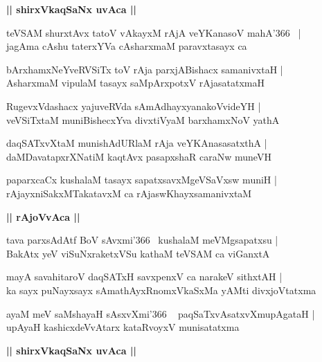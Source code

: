 \documentclass[twoside,12pt,openright]{book}
\newcounter{shloka}[chapter]
\def\uvaca#1{\centerline{{\large\textbf{#1}}}}
\begin{document}
\uvaca{|| shirxVkaqSaNx uvAca ||}

\begin{shloka}%
teVSAM shurxtAvx tatoV vAkayxM rAjA veYKanasoV mahA\char'366 ~|\\
jagAma cAshu taterxYVa cAsharxmaM paravxtasayx ca 
\end{shloka}

\begin{shloka}%
bArxhamxNeYveRVSiTx toV rAja parxjABishacx samanivxtaH |\\
AsharxmaM vipulaM tasayx saMpArxpotxV rAjasatatxmaH 
\end{shloka}

\begin{shloka}%
RugevxVdashacx yajuveRVda sAmAdhayxyanakoVvideYH |\\
veVSiTxtaM muniBishecxYva divxtiVyaM barxhamxNoV yathA 
\end{shloka}

\begin{shloka}%
daqSATxvXtaM munishAdURlaM rAja veYKAnasasatxthA |\\
daMDavatapxrXNatiM kaqtAvx pasapxshaR caraNw muneVH
\end{shloka}

\begin{shloka}%
paparxcaCx kushalaM tasayx sapatxsavxMgeVSaVxsw muniH |\\
rAjayxniSakxMTakatavxM ca rAjaswKhayxsamanivxtaM 
\end{shloka}

\uvaca{|| rAjoVvAca ||}

\begin{shloka}%
tava parxsAdAtf BoV sAvxmi\char'366 ~kushalaM meVMgsapatxsu |\\
BakAtx yeV viSuNxraketxVSu kathaM teVSAM ca viGanxtA
\end{shloka}

\begin{shloka}%
mayA savahitaroV daqSATxH savxpenxV ca narakeV sithxtAH |\\
ka sayx puNayxsayx sAmathAyxRnomxVkaSxMa yAMti divxjoVtatxma
\end{shloka}

\begin{shloka}%
ayaM meV saMshayaH sAsxvXmi\char'366 ~ paqSaTxvAsatxvXmupAgataH |\\
upAyaH kashicxdeVvAtarx kataRvoyxV munisatatxma
\end{shloka}

\uvaca{|| shirxVkaqSaNx uvAca ||}
\end{document}
